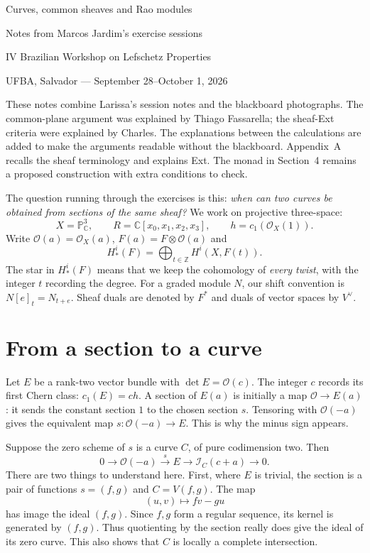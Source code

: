 \documentclass[11pt,a4paper]{article}
\theoremstyle{remark}
\begin{document}
\thispagestyle{plain}
\begin{center}
{\LARGE Curves, common sheaves and
Rao modules}\par
\vspace{6pt}
{\large Notes from Marcos Jardim's
exercise sessions}\par
\vspace{5pt}
IV Brazilian Workshop on Lefschetz
Properties\par
UFBA, Salvador --- September 28--October 1,
2026
\end{center}
\vspace{4pt}

These notes combine Larissa's session
notes and the blackboard photographs.
The common-plane argument was explained
by Thiago Fassarella; the sheaf-Ext
criteria were explained by Charles.
The explanations between the calculations
are added to make the arguments readable
without the blackboard. Appendix~A recalls
the sheaf terminology and explains Ext.
The monad in Section~4 remains a proposed
construction with extra conditions to check.

The question running through the exercises
is this: \emph{when can two curves be
obtained from sections of the same sheaf?}
We work on projective three-space:
$$
X=\mathbb{P}^3_{\mathbb{C}},\qquad
R=\mathbb{C}[x_0,x_1,x_2,x_3],\qquad
h=c_1(\mathcal{O}_X(1)).
$$
Write $\mathcal{O}(a)=\mathcal{O}_X(a)$,
$F(a)=F\otimes\mathcal{O}(a)$ and
$$
H^i_*(F)=\bigoplus_{t\in\mathbb{Z}}
H^i(X,F(t)).
$$
The star in $H^i_*(F)$ means that we keep
the cohomology of \emph{every twist},
with the integer $t$ recording the degree.
For a graded module $N$, our shift
convention is $N[e]_t=N_{t+e}$.
Sheaf duals are denoted by $F^*$ and
duals of vector spaces by $V^\vee$.

\section{From a section to a curve}

Let $E$ be a rank-two vector bundle
with $\det E=\mathcal{O}(c)$.
The integer $c$ records its first Chern
class: $c_1(E)=ch$.
A section of $E(a)$ is initially a map
$\mathcal{O}\to E(a)$: it sends the
constant section $1$ to the chosen
section $s$. Tensoring with
$\mathcal{O}(-a)$ gives the equivalent
map $s:\mathcal{O}(-a)\to E$.
This is why the minus sign appears.

Suppose the zero scheme of $s$ is a
curve $C$, of pure codimension two.
Then
\begin{equation}
0\longrightarrow\mathcal{O}(-a)
\xrightarrow{s}E
\longrightarrow\mathcal{I}_C(c+a)
\longrightarrow0.
\label{eq-section}
\end{equation}
There are two things to understand here.
First, where $E$ is trivial, the section
is a pair of functions $s=(f,g)$ and
$C=V(f,g)$. The map
$$
(u,v)\longmapsto fv-gu
$$
has image the ideal $(f,g)$.
Since $f,g$ form a regular sequence,
its kernel is generated by $(f,g)$.
Thus quotienting by the section really
does give the ideal of its zero curve.
This also shows that $C$ is locally a
complete intersection.
\end{document}
